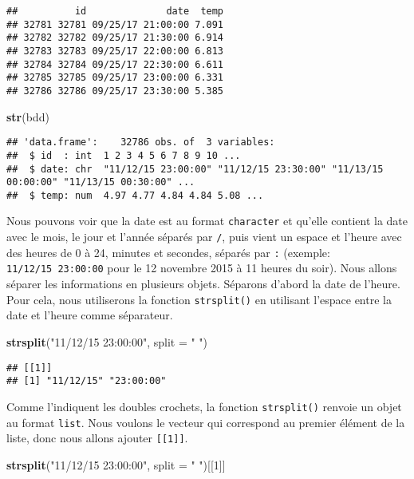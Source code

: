 \documentclass[]{book}
\newenvironment{Shaded}{\begin{snugshade}}{\end{snugshade}}
\newcommand{\KeywordTok}[1]{\textcolor[rgb]{0.13,0.29,0.53}{\textbf{#1}}}
\newcommand{\DataTypeTok}[1]{\textcolor[rgb]{0.13,0.29,0.53}{#1}}
\newcommand{\DecValTok}[1]{\textcolor[rgb]{0.00,0.00,0.81}{#1}}
\newcommand{\StringTok}[1]{\textcolor[rgb]{0.31,0.60,0.02}{#1}}
\newcommand{\NormalTok}[1]{#1}
\theoremstyle{definition}
\theoremstyle{definition}
\theoremstyle{definition}
\theoremstyle{remark}
\begin{document}
\begin{verbatim}
##          id              date  temp
## 32781 32781 09/25/17 21:00:00 7.091
## 32782 32782 09/25/17 21:30:00 6.914
## 32783 32783 09/25/17 22:00:00 6.813
## 32784 32784 09/25/17 22:30:00 6.611
## 32785 32785 09/25/17 23:00:00 6.331
## 32786 32786 09/25/17 23:30:00 5.385
\end{verbatim}

\begin{Shaded}
\begin{Highlighting}[]
\KeywordTok{str}\NormalTok{(bdd)}
\end{Highlighting}
\end{Shaded}

\begin{verbatim}
## 'data.frame':    32786 obs. of  3 variables:
##  $ id  : int  1 2 3 4 5 6 7 8 9 10 ...
##  $ date: chr  "11/12/15 23:00:00" "11/12/15 23:30:00" "11/13/15 00:00:00" "11/13/15 00:30:00" ...
##  $ temp: num  4.97 4.77 4.84 4.84 5.08 ...
\end{verbatim}

Nous pouvons voir que la date est au format \texttt{character} et
qu'elle contient la date avec le mois, le jour et l'année séparés par
\texttt{/}, puis vient un espace et l'heure avec des heures de 0 à 24,
minutes et secondes, séparés par \texttt{:} (exemple:
\texttt{11/12/15\ 23:00:00} pour le 12 novembre 2015 à 11 heures du
soir). Nous allons séparer les informations en plusieurs objets.
Séparons d'abord la date de l'heure. Pour cela, nous utiliserons la
fonction \texttt{strsplit()} en utilisant l'espace entre la date et
l'heure comme séparateur.

\begin{Shaded}
\begin{Highlighting}[]
\KeywordTok{strsplit}\NormalTok{(}\StringTok{"11/12/15 23:00:00"}\NormalTok{, }\DataTypeTok{split =} \StringTok{" "}\NormalTok{)}
\end{Highlighting}
\end{Shaded}

\begin{verbatim}
## [[1]]
## [1] "11/12/15" "23:00:00"
\end{verbatim}

Comme l'indiquent les doubles crochets, la fonction \texttt{strsplit()}
renvoie un objet au format \texttt{list}. Nous voulons le vecteur qui
correspond au premier élément de la liste, donc nous allons ajouter
\texttt{{[}{[}1{]}{]}}.

\begin{Shaded}
\begin{Highlighting}[]
\KeywordTok{strsplit}\NormalTok{(}\StringTok{"11/12/15 23:00:00"}\NormalTok{, }\DataTypeTok{split =} \StringTok{" "}\NormalTok{)[[}\DecValTok{1}\NormalTok{]]}
\end{Highlighting}
\end{Shaded}
\end{document}
